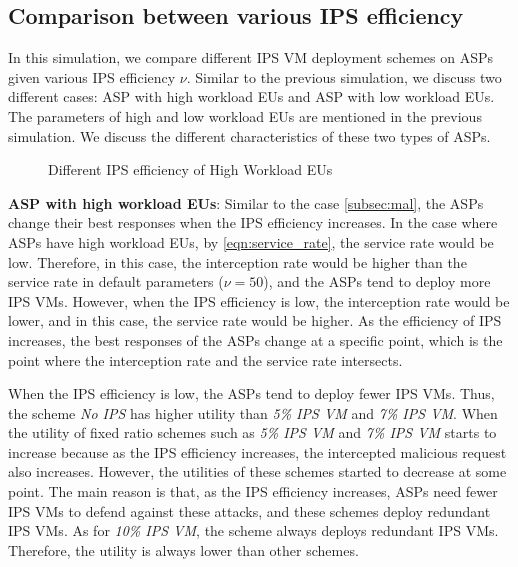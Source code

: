 \documentclass[10pt,journal, compsoc]{IEEEtran}
\begin{document}
\subsection{Comparison between various IPS efficiency}
In this simulation, we compare different IPS VM deployment schemes on ASPs given various IPS efficiency $\nu$. Similar to the previous simulation, we discuss two different cases: ASP with high workload EUs and ASP with low workload EUs. The parameters of high and low workload EUs are mentioned in the previous simulation. We discuss the different characteristics of these two types of ASPs.

\begin{figure}[!]
\captionsetup{justification=centering}
  \hfill
  \hfill
\label{fig:eff_high}
\caption{Different IPS efficiency of High Workload EUs}
\end{figure}
\textbf{ASP with high workload EUs}: Similar to the case \cref{subsec:mal}, the ASPs change their best responses when the IPS efficiency increases. In the case where ASPs have high workload EUs, by \cref{eqn:service_rate}, the service rate would be low. Therefore, in this case, the interception rate would be higher than the service rate in default parameters ($\nu = 50$), and the ASPs tend to deploy more IPS VMs. However, when the IPS efficiency is low, the interception rate would be lower, and in this case, the service rate would be higher. As the efficiency of IPS increases, the best responses of the ASPs change at a specific point, which is the point where the interception rate and the service rate intersects.


When the IPS efficiency is low, the ASPs tend to deploy fewer IPS VMs. Thus, the scheme \textit{No IPS} has higher utility than \textit{5\% IPS VM} and \textit{7\% IPS VM}. When the utility of fixed ratio schemes such as \textit{5\% IPS VM} and \textit{7\% IPS VM} starts to increase because as the IPS efficiency increases, the intercepted malicious request also increases. However, the utilities of these schemes started to decrease at some point. The main reason is that, as the IPS efficiency increases, ASPs need fewer IPS VMs to defend against these attacks, and these schemes deploy redundant IPS VMs. As for \textit{10\% IPS VM}, the scheme always deploys redundant IPS VMs. Therefore, the utility is always lower than other schemes.
\end{document}
